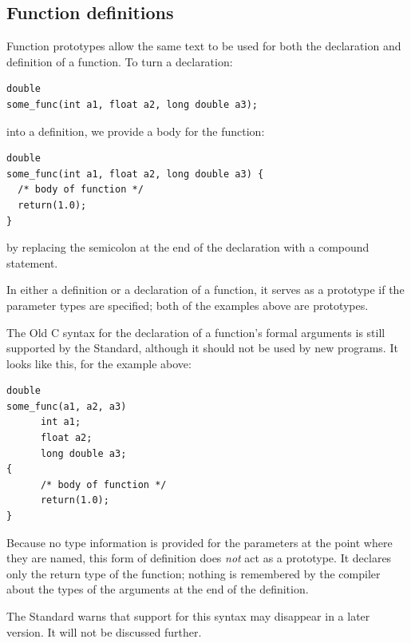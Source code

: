   

  \subsection{Function definitions}
   

   Function prototypes allow the same text to be used for both the
    declaration and definition of a function. To turn a declaration:

\begin{Verbatim}
double
some_func(int a1, float a2, long double a3);
\end{Verbatim}

   into a definition, we provide a body for the function:

\begin{Verbatim}
double
some_func(int a1, float a2, long double a3) {
  /* body of function */
  return(1.0);
}
\end{Verbatim}

   by replacing the semicolon at the end of the declaration with a
    compound statement.


   In either a definition or a declaration of a function, it serves as a
    prototype if the parameter types are specified; both of the examples
    above are prototypes.


   The Old C syntax for the declaration of a function's formal arguments
    is still supported by the Standard, although it should not be used by
    new programs. It looks like this, for the example above:

\begin{Verbatim}
double
some_func(a1, a2, a3)
      int a1;
      float a2;
      long double a3;
{
      /* body of function */
      return(1.0);
}
\end{Verbatim}

   Because no type information is provided for the parameters at the
    point where they are named, this form of definition does \textit{not}
    act as a prototype. It declares only the return type of the function;
    nothing is remembered by the compiler about the types of the arguments
    at the end of the definition.


   The Standard warns that support for this syntax may disappear in a
    later version. It will not be discussed further.


